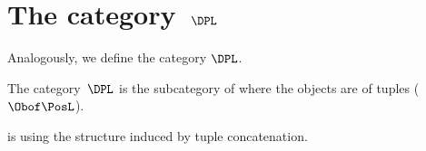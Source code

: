 
\section{The category~$\DPL$}

Analogously, we define the category $\DPL$.

\begin{definition}\label{def:DPL}
    The category~$\DPL$ is the subcategory of \DP where the objects are  of tuples ($\Obof\PosL$).
\end{definition}
\begin{lemma}
    \DPL is  using the structure induced by tuple concatenation.
\end{lemma}

